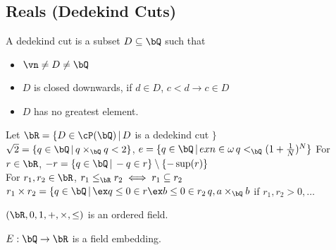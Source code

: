 
\subsection{Reals (Dedekind Cuts)}

\begin{definition}
    A dedekind cut is a subset $D \subseteq \bQ$ such that 
    \begin{itemize}
        \item $\vn \neq D \neq \bQ$ 
        \item $D$ is closed downwards, if $d \in D$, $c < d \to c \in D$ 
        \item $D$ has no greatest element. 
    \end{itemize}
\end{definition}

\noindent
Let $\bR = \{D \in \cP(\bQ) \, | \, D$ is a dedekind cut $\}$ \\
$\sqrt{2} = \{q \in \bQ \, | \, q \times_{\bQ} q < 2\}$, $e = \{q \in \bQ \, | \, ex n \in \omega \, q <_{\bQ} (1 + \frac{1}{N})^N\}$ 
For $r \in \bR$, $-r = \{q \in \bQ \, | \, -q \in r\} \setminus \{-\sup(r)\}$ \\
For $r_1, r_2 \in \bR$, $r_1 \le_{\bR} r_2 \iff r_1 \subseteq r_2$ \\
$r_1 \times r_2 = \{q \in \bQ \, | \, \ex q \le 0 \in r \ex b \le 0 \in r_2 \, q , a \times_{\bQ} b$ if $r_1, r_2 > 0, \ldots$ 

\begin{theorem}
    $(\bR, 0, 1, + , \times, \le)$ is an ordered field. 
\end{theorem}

\noindent
$E: \bQ \to \bR$ is a field embedding. 

